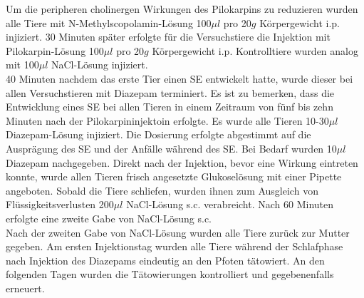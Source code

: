 \documentclass[a4paper,11pt]{report}
\begin{document}
{Um die peripheren cholinergen Wirkungen des Pilokarpins zu reduzieren wurden alle Tiere mit N-Methylscopolamin-Lösung 100$\mu l$ pro 20$g$ Körpergewicht i.p. injiziert. 30 Minuten später erfolgte für die Versuchstiere die Injektion mit Pilokarpin-Lösung 100$\mu l$ pro 20$g$ Körpergewicht i.p. Kontrolltiere wurden analog mit 100$\mu l$ NaCl-Lösung injiziert.\\

40 Minuten nachdem das erste Tier einen SE entwickelt hatte, wurde dieser bei allen Versuchstieren mit Diazepam terminiert. Es ist zu bemerken, dass die Entwicklung eines SE bei allen Tieren in einem Zeitraum von fünf bis zehn Minuten nach der Pilokarpininjektoin erfolgte. Es wurde alle Tieren 10-30$\mu l$ Diazepam-Lösung injiziert. Die Dosierung erfolgte abgestimmt auf die Ausprägung des SE und der Anfälle während des SE. Bei Bedarf wurden 10$\mu l$ Diazepam nachgegeben. Direkt nach der Injektion, bevor eine Wirkung eintreten konnte, wurde allen Tieren frisch angesetzte Glukoselösung mit einer Pipette angeboten. Sobald die Tiere schliefen, wurden ihnen zum Ausgleich von Flüssigkeitsverlusten 200$\mu l$ NaCl-Lösung s.c. verabreicht. Nach 60 Minuten erfolgte eine zweite Gabe von NaCl-Lösung s.c. \\

Nach der zweiten Gabe von NaCl-Lösung wurden alle Tiere zurück zur Mutter gegeben.
Am ersten Injektionstag wurden alle Tiere während der Schlafphase nach Injektion des Diazepams eindeutig an den Pfoten tätowiert. An den folgenden Tagen wurden die Tätowierungen kontrolliert und gegebenenfalls erneuert. \\

}
\end{document}
